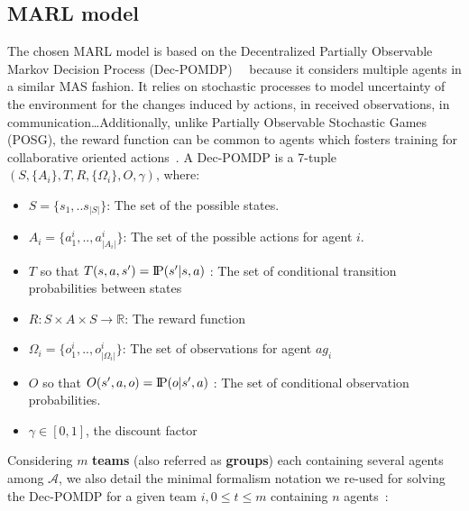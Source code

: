 \documentclass[runningheads]{llncs}
\newcommand{\probP}{\text{I\kern-0.15em P}}
\begin{document}
\subsection{MARL model}

The chosen MARL model is based on the Decentralized Partially Observable Markov Decision Process (Dec-POMDP)~~\cite{Oliehoek2016} because it considers multiple agents in a similar MAS fashion. It relies on stochastic processes to model uncertainty of the environment for the changes induced by actions, in received observations, in communication\dots Additionally, unlike Partially Observable Stochastic Games (POSG), the reward function can be common to agents which fosters training for collaborative oriented actions~\cite{Beynier2013}.
A Dec-POMDP is a 7-tuple $(S,\{A_i\},T,R,\{\Omega_i\},O,\gamma)$, where:
\begin{itemize}
    \item $S = \{s_1, ..s_{|S|}\}$: The set of the possible states.
    \item $A_{i} = \{a_{1}^{i},..,a_{|A_{i}|}^{i}\}$: The set of the possible actions for agent $i$.
    \item $T$ so that $T(s,a,s') = \probP{(s'|s,a)}$ : The set of conditional transition probabilities between states
    \item $R: S \times A \times S \rightarrow \mathbb{R}$: The reward function
    \item $\Omega_{i} = \{o_{1}^{i},..,o_{|\Omega_{i}|}^{i}\}$: The set of observations for agent $ag_i$
    \item $O$ so that $O(s',a,o) = \probP{(o|s',a)}$ : The set of conditional observation probabilities.
    \item $\gamma \in [0,1]$, the discount factor
\end{itemize}

Considering $m$ \textbf{teams} (also referred as \textbf{groups}) each containing several agents among $\mathcal{A}$, we also detail the minimal formalism notation we re-used for solving the Dec-POMDP for a given team $i, 0 \leq t \leq m$ containing $n$ agents~\cite{Beynier2013,Albrecht2024}:
\end{document}
